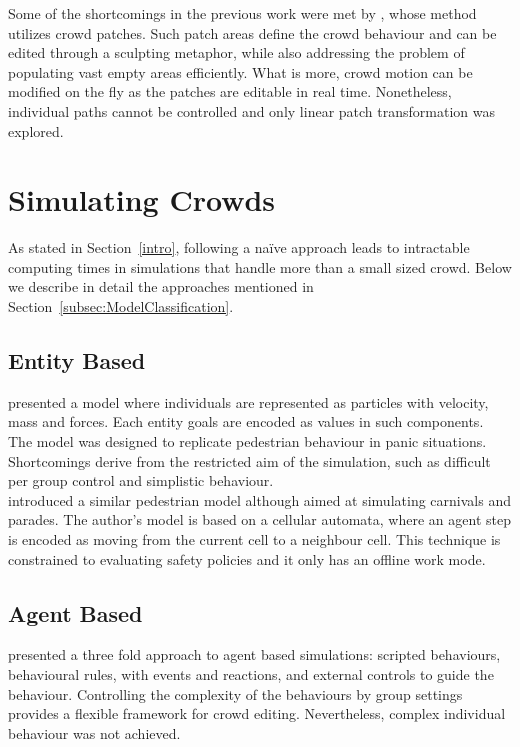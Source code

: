 \documentclass[6pt]{article} %
\begin{document}
\begin{multicols}{2}
Some of the shortcomings in the previous work were met by \cite{Jordao2014}, whose method utilizes crowd patches.
Such patch areas define the crowd behaviour and can be edited through a sculpting metaphor, while also addressing the problem of populating vast empty areas efficiently.
What is more, crowd motion can be modified on the fly as the patches are editable in real time.
Nonetheless, individual paths cannot be controlled and only linear patch transformation was explored.

\section{Simulating Crowds}

As stated in Section~\ref{intro}, following a na\"ive approach leads to intractable computing times in simulations that handle more than a small sized crowd.
Below we describe in detail the approaches mentioned in Section~\ref{subsec:ModelClassification}. 

\subsection{Entity Based}

\cite{Helbing2000} presented a model where individuals are represented as particles with velocity, mass and forces.
Each entity goals are encoded as values in such components.
The model was designed to replicate pedestrian behaviour in panic situations.
Shortcomings derive from the restricted aim of the simulation, such as difficult per group control and simplistic behaviour.\\

\cite{batty2003} introduced a similar pedestrian model although aimed at simulating carnivals and parades.
The author's model is based on a cellular automata, where an agent step is encoded as moving from the current cell to a neighbour cell.
This technique is constrained to evaluating safety policies and it only has an offline work mode.

\subsection{Agent Based}

\cite{raupp2001} presented a three fold approach to agent based simulations: scripted behaviours, behavioural rules, with events and reactions, and external controls to guide the behaviour.
Controlling the complexity of the behaviours by group settings provides a flexible framework for crowd editing.
Nevertheless, complex individual behaviour was not achieved.\\


\end{multicols}
\end{document}

